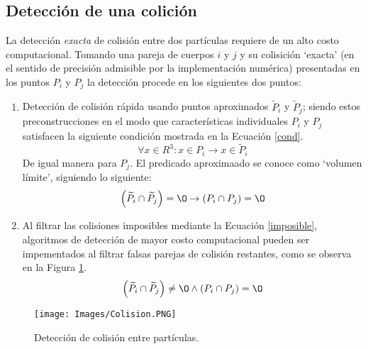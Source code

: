 \subsection{Detecci\'on de una colici\'on} \label{detect}

\noindent
\justify

La detecci\'on \textit{exacta} de colisi\'on entre dos part\'iculas requiere de un alto costo computacional. Tomando una pareja de cuerpos $i$ y $j$ y su colisici\'on `exacta' (en el sentido de precisi\'on admisible por la implementaci\'on num\'erica) presentadas en los puntos $P_i$ y $P_j$ la detecci\'on procede en los siguientes dos puntos:

\begin{enumerate}
	\item Detecci\'on de colisi\'on r\'apida usando puntos aproximados $\widetilde{P}_i$ y $\widetilde{P}_j$; siendo estos preconstrucciones en el modo que caracter\'isticas individuales $P_i$ y $P_j$ satisfacen la siguiente condici\'on mostrada en la Ecuaci\'on \ref{cond}.
	\begin{equation}
		\forall x \in R^3 : x \in P_i \rightarrow x \in \widetilde{P}_i
		\label{cond}
	\end{equation}
	De igual manera para $P_j$. El predicado aproximaado se conoce como `volumen l\'imite', siguiendo lo siguiente:
	\begin{equation}
		\left(\widetilde{P}_i \cap \widetilde{P}_j \right) = {\O} \rightarrow \left( P_i \cap P_j \right) = {\O}
		\label{imposible}
	\end{equation}
	\item Al filtrar las colisiones imposibles mediante la Ecuaci\'on \ref{imposible}, algoritmos de detecci\'on de mayor costo computacional pueden ser impementados al filtrar falsas parejas de colisi\'on restantes, como se observa en la Figura \ref{colision}.
	\begin{equation}
		\left(\widetilde{P}_i \cap \widetilde{P}_j \right) \neq {\O} \wedge \left(P_i \cap P_j \right) = {\O}
	\end{equation}
\end{enumerate}

\begin{figure}[h!]
\centering
\texttt{[image: Images/Colision.PNG]}
\caption{Detecci\'on de colisi\'on entre part\'iculas.}
\label{colision}
\end{figure}